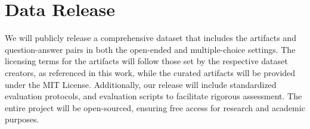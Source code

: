 \section{Data Release}

We will publicly release a comprehensive dataset that includes the artifacts and question-answer pairs in both the open-ended and multiple-choice settings. The licensing terms for the artifacts will follow those set by the respective dataset creators, as referenced in this work, while the curated artifacts will be provided under the MIT License. 
Additionally, our release will include standardized evaluation protocols, and evaluation scripts to facilitate rigorous assessment. The entire project will be open-sourced, ensuring free access for research and academic purposes.